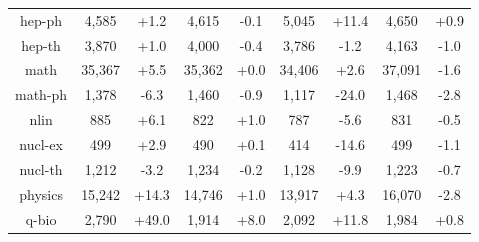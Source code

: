 \documentclass[]{rsos}%
\begin{document}
\begin{table}
\begin{center}
\begin{tabular}{|c|cccc|cccc|}
hep-ph &   4,585 &  +1.2 &   4,615       & -0.1 &   5,045 & +11.4 &   4,650        & +0.9 \\
hep-th &   3,870 &  +1.0 &   4,000       & -0.4 &   3,786 &  -1.2 &   4,163        & -1.0 \\
math &  35,367 &  +5.5 &  35,362       & +0.0 &  34,406 &  +2.6 &  37,091        & -1.6 \\
math-ph &   1,378 &  -6.3 &   1,460       & -0.9 &   1,117 & -24.0 &   1,468        & -2.8 \\
nlin &     885 &  +6.1 &     822       & +1.0 &     787 &  -5.6 &     831        & -0.5 \\
nucl-ex &     499 &  +2.9 &     490       & +0.1 &     414 & -14.6 &     499        & -1.1 \\
nucl-th &   1,212 &  -3.2 &   1,234       & -0.2 &   1,128 &  -9.9 &   1,223        & -0.7 \\
physics &  15,242 & +14.3 &  14,746       & +1.0 &  13,917 &  +4.3 &  16,070        & -2.8 \\
q-bio &   2,790 & +49.0 &   1,914       & +8.0 &   2,092 & +11.8 &   1,984        & +0.8 \\

\end{tabular}
\end{center}
\end{table}
\end{document}
